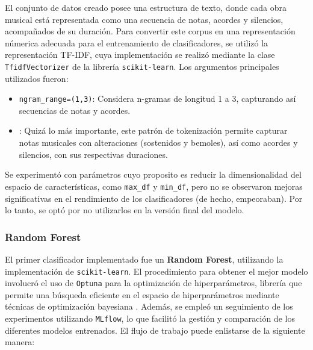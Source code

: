 \documentclass[paper=letter, fontsize=11pt, draft=false]{scrartcl}
\numberwithin{equation}{problemcounter} %
\numberwithin{figure}{problemcounter} %
\numberwithin{table}{problemcounter} %
\numberwithin{subsection}{problemcounter}
\begin{document}
El conjunto de datos creado posee una estructura de texto, donde cada obra musical está representada como una secuencia de notas, acordes y silencios, acompañados de su duración. Para convertir este corpus en una representación númerica adecuada para el entrenamiento de clasificadores, se utilizó la representación TF-IDF, cuya implementación se realizó mediante la clase \texttt{TfidfVectorizer} de la librería \texttt{scikit-learn}. Los argumentos principales utilizados fueron:
\begin{itemize}
    \item \texttt{ngram\_range=(1,3)}: Considera n-gramas de longitud 1 a 3, capturando así secuencias de notas y acordes.
    \item \texttt{}: Quizá lo más importante, este patrón de tokenización permite capturar notas musicales con alteraciones (sostenidos y bemoles), así como acordes y silencios, con sus respectivas duraciones.
\end{itemize}
 
Se experimentó con parámetros cuyo proposito es reducir la dimensionalidad del espacio de características, como \texttt{max\_df} y \texttt{min\_df}, pero no se observaron mejoras significativas en el rendimiento de los clasificadores (de hecho, empeoraban). Por lo tanto, se optó por no utilizarlos en la versión final del modelo.

\subsubsection{Random Forest}

El primer clasificador implementado fue un \textbf{Random Forest}, utilizando la implementación de \texttt{scikit-learn}. El procedimiento para obtener el mejor modelo involucró el uso de \texttt{Optuna} para la optimización de hiperparámetros, librería que permite una búsqueda eficiente en el espacio de hiperparámetros mediante técnicas de optimización bayesiana \cite{}. Además, se empleó un seguimiento de los experimentos utilizando \texttt{MLflow}, lo que facilitó la gestión y comparación de los diferentes modelos entrenados. El flujo de trabajo puede enlistarse de la siguiente manera:
\end{document}

